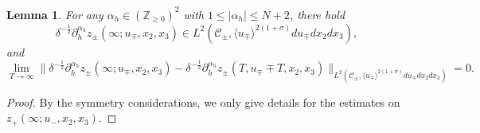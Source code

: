 \documentclass[10pt,reqno]{amsart}
\numberwithin{equation}{section}
\newtheorem{lemma}[theorem]{Lemma}
\begin{document}
\begin{lemma}\label{lemma5}
For any $\alpha_h\in(\mathbb{Z}_{\geqslant 0})^2$ with 
$1\leqslant|\alpha_h|\leqslant N+2$, there hold
\begin{equation*} 
\delta^{-\frac{1}{2}}\partial_h^{\alpha_h} z_{\pm}(\infty;u_\mp,x_2,x_3)\in L^2(\mathcal{C}_\pm,\langle u_\mp\rangle^{2(1+\sigma)}du_\mp dx_2dx_3),
\end{equation*}
and 
\begin{equation*} 
	\lim_{T\to\infty}\Big\|\delta^{-\frac{1}{2}}\partial_h^{\alpha_h}z_{\pm}(\infty;u_\mp,x_2,x_3)-\delta^{-\frac{1}{2}}\partial_h^{\alpha_h}z_{\pm}(T,u_\mp\mp T,x_2,x_3)\Big\|_{L^2(\mathcal{C}_\pm,\langle u_\mp\rangle^{2(1+\sigma)}du_\mp dx_2dx_3)}=0.
\end{equation*}
\end{lemma}
\begin{proof}
By the symmetry considerations, we only give details for the estimates on $z_{+}(\infty;u_-,x_2,x_3)$.
		

\end{proof}
\end{document}
